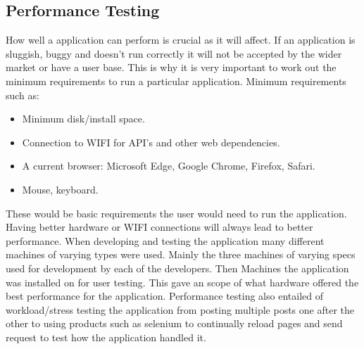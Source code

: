 \subsection{Performance Testing}
How well a application can perform is crucial as it will affect. If an application is sluggish, buggy and doesn't run correctly it will not be accepted by the wider market or have a user base. This is why it is very important to work out the minimum requirements to run a particular application. Minimum requirements such as: 
\begin{itemize}
\item Minimum disk/install space.
\item Connection to WIFI for API's and other web dependencies.
\item A current browser: Microsoft Edge, Google Chrome, Firefox, Safari. 
\item Mouse, keyboard.
\end{itemize}
These would be basic requirements the user would need to run the application. Having better hardware or WIFI connections will always lead to better performance. When developing and testing the application many different machines of varying types were used. Mainly the three machines of varying specs used for development by each of the developers. Then Machines the application was installed on for user testing. This gave an scope of what hardware offered the best performance for the application. Performance testing also entailed of workload/stress testing the application from posting multiple posts one after the other to using products such as selenium to continually reload pages and send request to test how the application handled it. 
